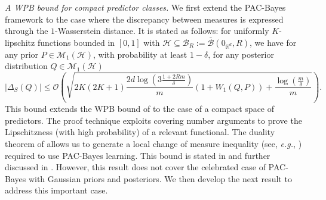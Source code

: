 \textit{A WPB bound for compact predictor classes.}
We first extend the PAC-Bayes framework to the case where the discrepancy between measures is expressed through the $1$-Wasserstein distance. It is stated as follows: for uniformly $K$-lipschitz functions bounded in $[0,1]$ with  $\mathcal{H}\subseteq \mathcal{B}_R:= \bar{\mathcal{B}}(0_{\mathbb{R}^d},R)$, we have for any prior $P\in\mathcal{M}_1(\mathcal{H})$, with probability at least $1-\delta$, for any posterior distribution $Q\in\mathcal{M}_1(\mathcal{H})$
\[ |\Delta_S(Q)| \leq \mathcal{O}\left(\sqrt{2K(2K+1)\frac{2d\log\left(3\frac{1 +2Rm }{\delta}\right)}{m} \left(1+W_1(Q,P)  \right) +\frac{\log\left( \frac{m}{\delta} \right)}{m} } \right). \]
This bound extends the WPB bound of \citet{amit2022integral} to the case of a compact space of predictors. The proof technique exploits covering number arguments to prove the Lipschitzness (with high probability) of a relevant functional. The duality theorem of \citet[Theorem 5.10]{villani2009optimal} allows us to generate a local change of measure inequality (see, \emph{e.g.}, \citealp{donsker1976asymp}) required to use PAC-Bayes learning.
This bound is stated in  and further discussed in . However, this result does not cover the celebrated case of PAC-Bayes with Gaussian priors and posteriors. We then develop the next result to address this important case.

